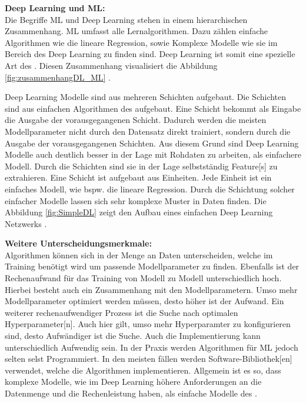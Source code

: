 \textbf{\gls{Deep Learning} und \gls{ML}:}\\
Die Begriffe \gls{ML} und \gls{Deep Learning} stehen in einem hierarchischen Zusammenhang. \Gls{ML} umfasst alle Lernalgorithmen. Dazu zählen einfache Algorithmen wie die lineare Regression, sowie Komplexe Modelle wie sie im Bereich des \gls{Deep Learning} zu finden sind. \gls{Deep Learning} ist somit eine spezielle Art des . Diesen Zusammenhang visualisiert die Abbildung \ref{fig:zusammenhangDL_ML} \cite{Goodfellow.2016, Burkov.2019}.


\gls{Deep Learning} Modelle sind aus mehreren Schichten aufgebaut. Die Schichten sind aus einfachen Algorithmen des  aufgebaut. Eine Schicht bekommt als Eingabe die Ausgabe der vorausgegangenen Schicht. Dadurch werden die meisten Modellparameter nicht durch den Datensatz direkt trainiert, sondern durch die Ausgabe der vorausgegangenen Schichten. Aus diesem Grund sind \gls{Deep Learning} Modelle auch deutlich besser in der Lage mit Rohdaten zu arbeiten, als einfachere Modell. Durch die Schichten sind sie in der Lage selbstständig \gls{Feature}[s] zu extrahieren. Eine Schicht ist aufgebaut aus Einheiten. Jede Einheit ist ein einfaches Modell, wie bspw. die lineare Regression. Durch die Schichtung solcher einfacher Modelle lassen sich sehr komplexe Muster in Daten finden. Die Abbildung \ref{fig:SimpleDL} zeigt den Aufbau eines einfachen \gls{Deep Learning} Netzwerks \cite{Burkov.2019, Goodfellow.2016}. 


\textbf{Weitere Unterscheidungsmerkmale:}\\
Algorithmen können sich in der Menge an Daten unterscheiden, welche im Training benötigt wird um passende Modellparameter zu finden. Ebenfalls ist der Rechenaufwand für das Training von Modell zu Modell unterschiedlich hoch. Hierbei besteht auch ein Zusammenhang mit den Modellparametern. Umso mehr Modellparameter optimiert werden müssen, desto höher ist der Aufwand. Ein weiterer rechenaufwendiger Prozess ist die Suche nach optimalen \gls{Hyperparameter}[n]. Auch hier gilt, umso mehr Hyperparamter zu konfigurieren sind, desto Aufwändiger ist die Suche. Auch die Implementierung kann unterschiedlich Aufwendig sein. In der Praxis werden Algorithmen für \gls{ML} jedoch selten selst Programmiert. In den meisten fällen werden Software-\gls{Bibliothek}[en] verwendet, welche die Algorithmen implementieren. Allgemein ist es so, dass komplexe Modelle, wie im \gls{Deep Learning} höhere Anforderungen an die Datenmenge und die Rechenleistung haben, als einfache Modelle des  \cite{Burkov.2019, ShalevShwartz.2014}. 